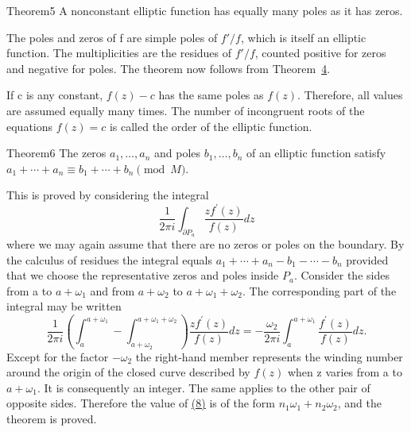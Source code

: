 \begin{originalstatement}{Theorem}{5}\label{thm:7.5}
A nonconstant elliptic function has equally many poles as it has zeros.
\end{originalstatement}
The poles and zeros of f are simple poles of $f'/f$, which is itself an elliptic function. The multiplicities are the residues of $f'/f$, counted positive for zeros and negative for poles. The theorem now follows from Theorem~\hyperref[thm:7.4]{4}.

If c is any constant, $f(z) - c$ has the same poles as $f(z)$. Therefore, all values are assumed equally many times. The number of incongruent roots of the equations $f(z) = c$ is called the order of the elliptic function.

\begin{originalstatement}{Theorem}{6}\label{thm:7.6}
The zeros $a_{1}, \ldots, a_{n}$ and poles $b_{1}, \ldots, b_{n}$ of an elliptic function satisfy $a_{1} + \cdots + a_{n} \equiv b_{1} + \cdots + b_{n} \pmod{M}$.
\end{originalstatement}
This is proved by considering the integral
\begin{equation*}
\frac {1}{2 \pi i} \int_ {\partial P _ {a}} \frac {z f ^ {\prime} (z)}{f (z)} d z\tag{8}\label{eq:7.8}
\end{equation*}
where we may again assume that there are no zeros or poles on the boundary. By the calculus of residues the integral equals $a_{1} + \cdots + a_{n} - b_{1} - \cdots - b_{n}$ provided that we choose the representative zeros and poles inside $P_{a}$. Consider the sides from a to $a + \omega_{1}$ and from $a + \omega_{2}$ to $a + \omega_{1} + \omega_{2}$. The corresponding part of the integral may be written
\begin{equation*}
\frac {1}{2 \pi i} \left(\int_ {a} ^ {a + \omega_ {1}} - \int_ {a + \omega_ {2}} ^ {a + \omega_ {1} + \omega_ {2}}\right) \frac {z f ^ {\prime} (z)}{f (z)} d z = - \frac {\omega_ {2}}{2 \pi i} \int_ {a} ^ {a + \omega_ {1}} \frac {f ^ {\prime} (z)}{f (z)} d z.
\end{equation*}
Except for the factor $-\omega_{2}$ the right-hand member represents the winding number around the origin of the closed curve described by $f(z)$ when z
varies from a to $a + \omega_{1}$. It is consequently an integer. The same applies to the other pair of opposite sides. Therefore the value of \hyperref[eq:7.8]{(8)} is of the form $n_{1}\omega_{1} + n_{2}\omega_{2}$, and the theorem is proved.

